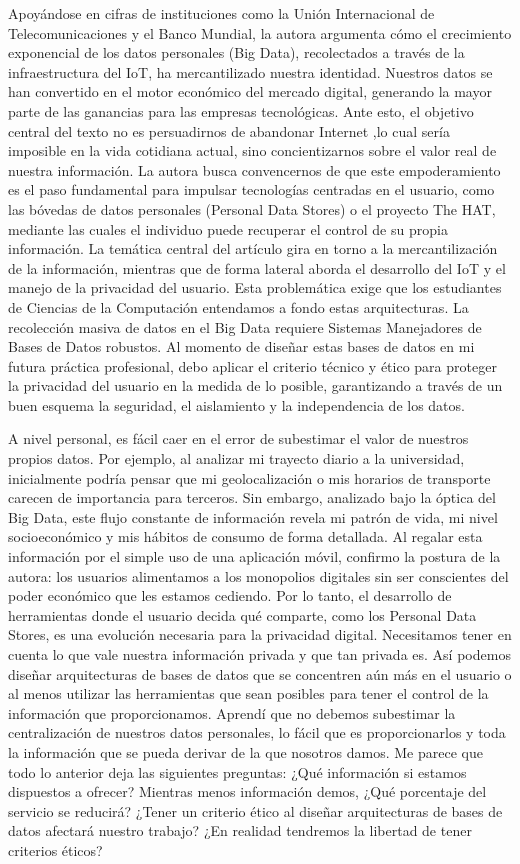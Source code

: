 Apoyándose en cifras de instituciones como la Unión Internacional de Telecomunicaciones y el Banco Mundial, la autora argumenta cómo el crecimiento exponencial de los datos personales (Big Data), recolectados a través de la infraestructura del IoT, ha mercantilizado nuestra identidad. Nuestros datos se han convertido en el motor económico del mercado digital, generando la mayor parte de las ganancias para las empresas tecnológicas. Ante esto, el objetivo central del texto no es persuadirnos de abandonar Internet ,lo cual sería imposible en la vida cotidiana actual, sino concientizarnos sobre el valor real de nuestra información. La autora busca convencernos de que este empoderamiento es el paso fundamental para impulsar tecnologías centradas en el usuario, como las bóvedas de datos personales (Personal Data Stores) o el proyecto The HAT, mediante las cuales el individuo puede recuperar el control de su propia información. 
La temática central del artículo gira en torno a la mercantilización de la información, mientras que de forma lateral aborda el desarrollo del IoT y el manejo de la privacidad del usuario. Esta problemática exige que los estudiantes de Ciencias de la Computación entendamos a fondo estas arquitecturas. La recolección masiva de datos en el Big Data requiere Sistemas Manejadores de Bases de Datos robustos. Al momento de diseñar estas bases de datos en mi futura práctica profesional, debo aplicar el criterio técnico y ético para proteger la privacidad del usuario en la medida de lo posible, garantizando a través de un buen esquema la seguridad, el aislamiento y la independencia de los datos.


A nivel personal, es fácil caer en el error de subestimar el valor de nuestros propios datos. Por ejemplo, al analizar mi trayecto diario a la universidad, inicialmente podría pensar que mi geolocalización o mis horarios de transporte carecen de importancia para terceros. Sin embargo, analizado bajo la óptica del Big Data, este flujo constante de información revela mi patrón de vida, mi nivel socioeconómico y mis hábitos de consumo de forma detallada. Al regalar esta información por el simple uso de una aplicación móvil, confirmo la postura de la autora: los usuarios alimentamos a los monopolios digitales sin ser conscientes del poder económico que les estamos cediendo. Por lo tanto, el desarrollo de herramientas donde el usuario decida qué comparte, como los Personal Data Stores, es una evolución necesaria para la privacidad digital.
Necesitamos tener en cuenta lo que vale nuestra información privada y que tan privada es. Así podemos diseñar arquitecturas de bases de datos que se concentren aún más en el usuario o al menos utilizar las herramientas que sean posibles para tener el control de la información que proporcionamos. Aprendí que no debemos subestimar la centralización de nuestros datos personales, lo fácil que es proporcionarlos y toda la información que se pueda derivar de la que nosotros damos. Me parece que todo lo anterior deja las siguientes preguntas: ¿Qué información si estamos dispuestos a ofrecer? Mientras menos información demos, ¿Qué porcentaje del servicio se reducirá? ¿Tener un criterio ético al diseñar arquitecturas de bases de datos afectará nuestro trabajo? ¿En realidad tendremos la libertad de tener criterios éticos?

